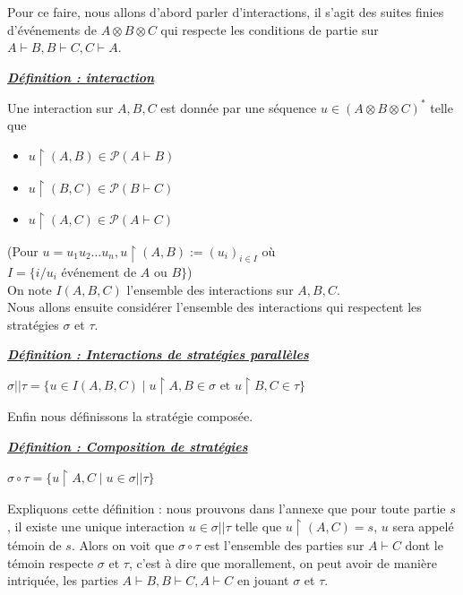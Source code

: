 \documentclass[a4paper,12pt]{article}
\renewenvironment{leftbar}{
  \def\FrameCommand{\vrule width 1pt \hspace{10pt}}
  \MakeFramed {\advance\hsize-\width \FrameRestore}
\setlength{\parskip}{10pt}}
 {\endMakeFramed}
\newenvironment{answer}[1]
{
  \vspace{0.5cm} \noindent \begin{minipage}{\linewidth}
    \textbf{\textit{\uline{#1}}}
    \begin{leftbar}
}
{
    \end{leftbar}\end{minipage}\vspace{0.2cm}
}
\begin{document}
Pour ce faire, nous allons d'abord parler d'interactions,
il s'agit des suites finies d'événements de $A\otimes B \otimes C$ qui
respecte les conditions de partie sur $A\vdash B,B\vdash C,C\vdash A$.

\begin{answer}{Définition : interaction}

Une interaction sur $A, B, C$ est donnée par une séquence
$u \in (A \otimes B \otimes C)^*$ telle que
\begin{itemize}
\item $u \upharpoonright (A, B) \in \mathcal{P}(A \vdash B)$
\item $u \upharpoonright (B, C) \in \mathcal{P}(B \vdash C)$
\item $u \upharpoonright (A, C) \in \mathcal{P}(A \vdash C)$
\end{itemize}
\end{answer}

(Pour $u = u_1 u_2 \dots u_n, u\upharpoonright (A,B) := (u_i)_{i\in I}
$ où $I = \{i / u_i \text{ événement de }A\text{ ou }B\}$)
\\

On note $I(A,B,C)$ l'ensemble des interactions sur $A,B,C$.
\\

Nous allons ensuite considérer l'ensemble des interactions
qui respectent les stratégies $\sigma$ et $\tau$.

\begin{answer}{Définition : Interactions de stratégies parallèles}
$\sigma || \tau = \{u \in I(A,B,C) \mid u \upharpoonright A,B \in \sigma \text{ et }u \upharpoonright B,C \in \tau\}$
\end{answer}

Enfin nous définissons la stratégie composée.

\begin{answer}{Définition : Composition de stratégies}
$\sigma \circ \tau = \{u \upharpoonright A,C \mid u \in \sigma || \tau\}$
\end{answer}

Expliquons cette définition : nous prouvons dans l'annexe que
pour toute partie
$s$, il existe une unique interaction $u \in \sigma || \tau$ telle que
$u\upharpoonright (A,C) = s$, $u$ sera appelé témoin de $s$.
Alors on voit que $\sigma \circ \tau$ est l'ensemble des parties sur $A\vdash C$
dont le témoin respecte $\sigma$ et $\tau$, c'est à dire que morallement,
on peut avoir de manière intriquée, les parties $A\vdash B, B\vdash C, A\vdash C$
en jouant $\sigma$ et $\tau$.
\end{document}

